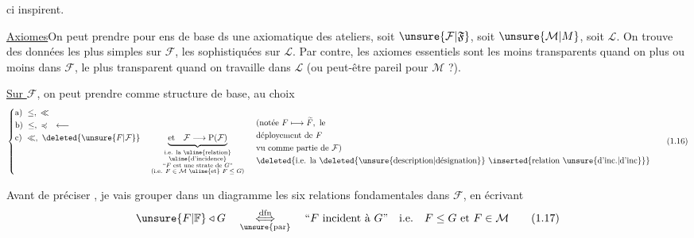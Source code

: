 %
ci inspirent.

\uline{Axiomes}\quad On peut prendre pour ens de base ds une axiomatique des ateliers, soit $\unsure{\mathcal{F}|\mathfrak{F}}$, soit $\unsure{\mathcal{M}|M}$, soit $\mathcal{L}$. On trouve des données les plus simples sur $\mathcal{F}$, les  sophistiquées sur $\mathcal{L}$. Par contre, les axiomes essentiels sont les moins transparents quand on  plus ou moins dans $\mathcal{F}$, le plus transparent quand on travaille dans $\mathcal{L}$ (ou peut-être pareil pour $\mathcal{M}$ ?).

\uline{Sur $\mathcal{F}$}, on peut prendre comme structure de base, au choix
\[
\left\{\begin{aligned}
 &\text{a)}\ \leq,\ \ll\\
 &\text{b)}\ \leq,\ \preccurlyeq \quad \longleftarrow\\
 &\text{c)}\ \ll,\ \deleted{\unsure{F|\mathcal{F}}}\quad
 \underbrace{\text{et}\quad\mathcal{F}\longrightarrow\mathrm{P}(\mathcal{F})}_{
 \begin{smallmatrix}
 \text{i.e. la \uline{relation}}\\[-1pt]
 \text{\uline{d'incidence}}\\
 \text{``$F$ est une strate de $G$''}\\
 \text{(i.e. $F\in\mathcal{M}$ \uline{et} $F\leq G$)}
 \end{smallmatrix}}
\end{aligned}\right.
\quad
\begin{aligned}
 &\text{(notée }F\longmapsto\widetilde F,\ \text{le}\\
 &\text{déployement de }F\\
 &\text{vu comme partie de }\mathcal{F}\text{)}\\
 &\text{\deleted{i.e. la \deleted{\unsure{description|désignation}} \inserted{relation \unsure{d'inc.|d'inc}}}}
\end{aligned}
\tag*{(1.16)}
\]

 Avant de préciser , je vais grouper dans un diagramme les six relations fondamentales dans $\mathcal{F}$, en écrivant
\[
\unsure{F|\mathbb{F}}\triangleleft G\quad
\underset{\unsure{\mathrm{par}}}{\overset{\mathrm{dfn}}{\Longleftrightarrow}}\quad
\text{``$F$ incident à $G$''}\quad\text{i.e.}\quad F\leq G\ \text{et}\ F\in\mathcal{M}
\tag*{(1.17)}
\]
